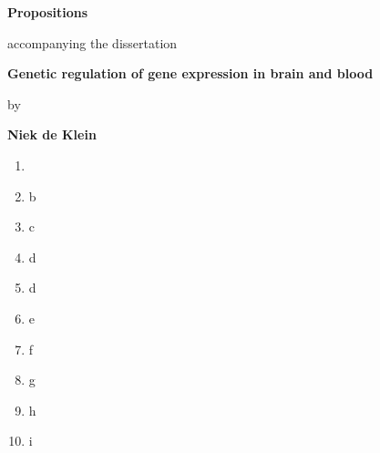 \documentclass[a5]{article}
\begin{document}
	\begin{center}
		{\large \textbf{Propositions}}
		
		\bigskip
		
		accompanying the dissertation
		
		\bigskip
		
		{\bfseries Genetic regulation of gene expression in brain and blood}
		
		\medskip
		
		by
		
		\medskip
		
		{ \textbf{Niek de Klein}}
	\end{center}
	
	\medskip
	
	\begin{enumerate}
		
		\item 
		\item b
		\item c
		\item d
		\item d
		\item e
		\item f
		\item g
		\item h
		\item i
		

\end{enumerate}
\end{document}
